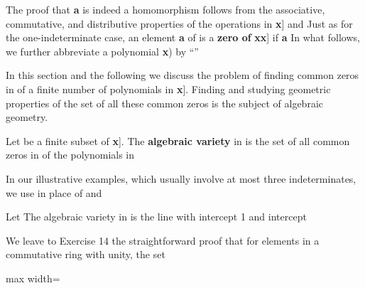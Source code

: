 \documentclass[11pt,oneside]{article}
\begin{document}
\BookNarrativetrue

\begin{BookBody}

\noindent The proof that \BookInline{\phi }\enspace\textbf{a} is indeed a homomorphism follows from the associative, commutative, and distributive properties of the operations in \BookInline{F[}\textbf{x}] and  Just as for the one-indeterminate case, an element\textbf{ a} of  is a\textbf{ zero of} \textbf{x}\BookInline{)\; \in F[}\textbf{x}] if \enspace\textbf{a} In what follows, we further abbreviate a polynomial \textbf{x}) by “”

In this section and the following we discuss the problem of finding common zeros in  of a finite number of polynomials  in \BookInline{F[}\textbf{x}]. Finding and studying geometric properties of the set of all these common zeros is the subject of algebraic geometry.

 Let  be a finite subset of \BookInline{F[}\textbf{x}]. The\textbf{ algebraic variety}  in  is the set of all common zeros in  of the polynomials in \BookEnd{\blacksquare}

In our illustrative examples, which usually involve at most three indeterminates, we use  in place of  and 

 Let  The algebraic variety  in  is the line with intercept 1 and intercept \BookEnd{\blacktriangle}

We leave to Exercise 14 the straightforward proof that for  elements  in a commutative ring  with unity, the set

\begin{center}\begin{adjustbox}{max width=\linewidth}\end{adjustbox}\end{center}


\end{BookBody}
\end{document}
